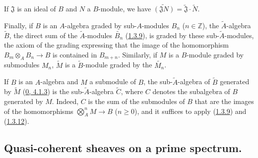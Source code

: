 \begin{env}[1.3.13]
If $\mathfrak{J}$ is an ideal of $B$ and $N$ a $B$-module, we have
$\widetilde{(\mathfrak{J}N)}=\widetilde{\mathfrak{J}}\cdot\widetilde{N}$.

Finally, if $B$ is an $A$-algebra graded by sub-$A$-modules $B_n$
($n\in\mathbb{Z}$), the $\widetilde{A}$-algebra $\widetilde{B}$, the direct
sum of the $\widetilde{A}$-modules $\widetilde{B_n}$
(\hyperref[I.1.3.9]{1.3.9}), is graded by these
sub-$\widetilde{A}$-modules, the axiom of the grading expressing that the
image of the homomorphism $B_m\otimes_A B_n\to B$ is contained in
$B_{m+n}$. Similarly, if $M$ is a $B$-module graded by submodules $M_n$,
$\widetilde{M}$ is a $\widetilde{B}$-module graded by the
$\widetilde{M_n}$.
\end{env}

\begin{env}[1.3.14]
\label{I.1.3.14}
If $B$ is an $A$-algebra and $M$ a submodule of $B$, the
sub-$\widetilde{A}$-algebra of $\widetilde{B}$ generated by $\widetilde{M}$
(\hyperref[0.4.1.3]{0, 4.1.3}) is the sub-$\widetilde{A}$-algebra
$\widetilde{C}$, where $C$ denotes the subalgebra of $B$ generated by
$M$. Indeed, $C$ is the sum of the submodules of $B$ that are the images of
the homomorphisms $\bigotimes_A^n M\to B$ ($n\geq0$), and it suffices to
apply (\hyperref[I.1.3.9]{1.3.9}) and (\hyperref[I.1.3.12]{1.3.12}).
\end{env}


\subsection{Quasi-coherent sheaves on a prime spectrum.}
\label{subsection:I.1.4}

